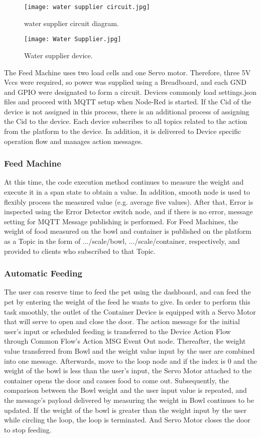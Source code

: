 \documentclass[conference]{IEEEtran}
\begin{document}
\begin{figure}[htbp]
\centerline{\texttt{[image: water supplier circuit.jpg]}}
\caption{water supplier circuit diagram.}
\label{fig}
\end{figure}

\begin{figure}[htbp]
\centerline{\texttt{[image: Water Supplier.jpg]}}
\caption{Water supplier device.}
\label{fig}
\end{figure}
The Feed Machine uses two load cells and one Servo motor. Therefore, three 5V Vccs were required, so power was supplied using a Breadboard, and each GND and GPIO were designated to form a circuit. 
Devices commonly load settings.json files and proceed with MQTT setup when Node-Red is started. If the Cid of the device is not assigned in this process, there is an additional process of assigning the Cid to the device.
Each device subscribes to all topics related to the action from the platform to the device. In addition, it is delivered to Device specific operation flow and manages action messages.
\subsubsection{Feed Machine}
At this time, the code execution method continues to measure the weight and execute it in a span state to obtain a value. In addition, smooth node is used to flexibly process the measured value (e.g. average five values).
After that, Error is inspected using the Error Detector switch node, and if there is no error, message setting for MQTT Message publishing is performed.
For Feed Machines, the weight of food measured on the bowl and container is published on the platform as a Topic in the form of .../scale/bowl, .../scale/container, respectively, and provided to clients who subscribed to that Topic.


\subsubsection{Automatic Feeding}
The user can reserve time to feed the pet using the dashboard, and can feed the pet by entering the weight of the feed he wants to give. In order to perform this task smoothly, the outlet of the Container Device is equipped with a Servo Motor that will serve to open and close the door.
The action message for the initial user's input or scheduled feeding is transferred to the Device Action Flow through Common Flow's Action MSG Event Out node. Thereafter, the weight value transferred from Bowl and the weight value input by the user are combined into one message.
Afterwards, move to the loop node and if the index is 0 and the weight of the bowl is less than the user's input, the Servo Motor attached to the container opens the door and causes food to come out.
Subsequently, the comparison between the Bowl weight and the user input value is repeated, and the message's payload delivered by measuring the weight in Bowl continues to be updated. If the weight of the bowl is greater than the weight input by the user while circling the loop, the loop is terminated. And Servo Motor closes the door to stop feeding.
\end{document}
